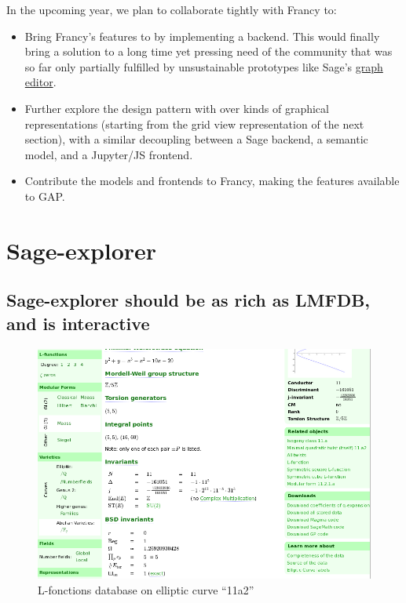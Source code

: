 \documentclass{deliverablereport}
\begin{document}
In the upcoming year, we plan to collaborate tightly with Francy to:
\begin{itemize}
\item Bring Francy's features to \Sage by implementing a backend. This
  would finally bring a solution to a long time yet pressing need of
  the community that was so far only partially fulfilled by
  unsustainable prototypes like Sage's
  \href{http://doc.sagemath.org/html/en/reference/graphs/sage/graphs/graph_editor.html}{graph editor}.
\item Further explore the design pattern with over kinds of graphical
  representations (starting from the grid view representation of the
  next section), with a similar decoupling between a Sage backend, a
  semantic model, and a Jupyter/JS frontend.
\item Contribute the models and frontends to Francy, making the
  features available to GAP.
\end{itemize}

\section{Sage-explorer}
\label{section:sage-explorer}


\subsection{Sage-explorer should be as rich as LMFDB, and is interactive}

\begin{figure}[h]
  \begin{center}
    \includegraphics[width=\textwidth]{images/LMFDB-11a2}
  \end{center}
  \caption{L-fonctions database on elliptic curve ``11a2''}
  \label{fig:lmfdb}
\end{figure}
\end{document}

